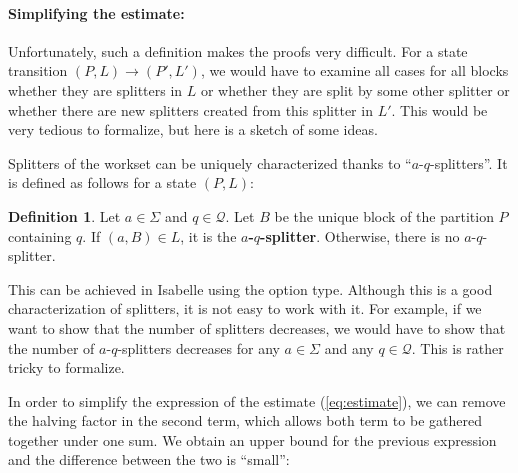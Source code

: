 \documentclass[12pt, a4 paper]{article}
\theoremstyle{definition}
\newtheorem{definition}{Definition}
\begin{document}
\paragraph{Simplifying the estimate:}
Unfortunately, such a definition makes the proofs very difficult. For a state transition $(P, L) \rightarrow (P', L')$, we would have to examine all cases for all blocks whether they are splitters in $L$ or whether they are split by some other splitter or whether there are new splitters created from this splitter in $L'$. This would be very tedious to formalize, but here is a sketch of some ideas.

Splitters of the workset can be uniquely characterized thanks to ``$a$-$q$-splitters''. It is defined as follows for a state $(P, L)$:

\begin{definition}
Let $a \in \Sigma$ and $q \in \mathcal{Q}$. Let $B$ be the unique block of the partition $P$ containing $q$. If $(a, B) \in L$, it is the \textbf{$a$-$q$-splitter}. Otherwise, there is no $a$-$q$-splitter.
\end{definition}

This can be achieved in Isabelle using the option type. Although this is a good characterization of splitters, it is not easy to work with it. For example, if we want to show that the number of splitters decreases, we would have to show that the number of $a$-$q$-splitters decreases for any $a \in \Sigma$ and any $q \in \mathcal{Q}$. This is rather tricky to formalize.

\bigskip

In order to simplify the expression of the estimate (\ref{eq:estimate}), we can remove the halving factor in the second term, which allows both term to be gathered together under one sum. We obtain an upper bound for the previous expression and the difference between the two is ``small'':
\end{document}
